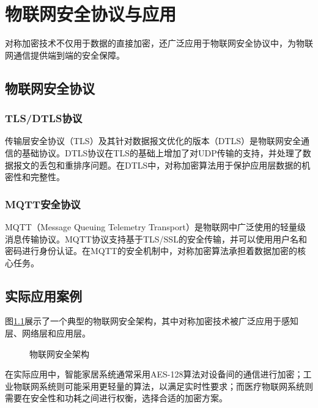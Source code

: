 \chapter{物联网安全协议与应用}

对称加密技术不仅用于数据的直接加密，还广泛应用于物联网安全协议中，为物联网通信提供端到端的安全保障。

\section{物联网安全协议}

\subsection{TLS/DTLS协议}

传输层安全协议（TLS）及其针对数据报文优化的版本（DTLS）是物联网安全通信的基础协议。DTLS协议在TLS的基础上增加了对UDP传输的支持，并处理了数据报文的丢包和重排序问题。在DTLS中，对称加密算法用于保护应用层数据的机密性和完整性。

\subsection{MQTT安全协议}

MQTT（Message Queuing Telemetry Transport）是物联网中广泛使用的轻量级消息传输协议。MQTT协议支持基于TLS/SSL的安全传输，并可以使用用户名和密码进行身份认证。在MQTT的安全机制中，对称加密算法承担着数据加密的核心任务。

\section{实际应用案例}

图\ref{fig:iot_architecture}展示了一个典型的物联网安全架构，其中对称加密技术被广泛应用于感知层、网络层和应用层。

\begin{figure}[htbp]
\centering
{}
\caption{物联网安全架构}
\label{fig:iot_architecture}
\end{figure}

在实际应用中，智能家居系统通常采用AES-128算法对设备间的通信进行加密；工业物联网系统则可能采用更轻量的算法，以满足实时性要求；而医疗物联网系统则需要在安全性和功耗之间进行权衡，选择合适的加密方案。

